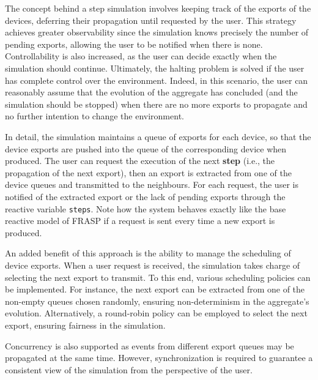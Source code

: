 The concept behind a step simulation involves keeping track of the exports of
the devices, deferring their propagation until requested by the user. This
strategy achieves greater observability since the simulation knows precisely
the number of pending exports, allowing the user to be notified when there is
none. Controllability is also increased, as the user can decide exactly when
the simulation should continue. Ultimately, the halting problem is solved if
the user has complete control over the environment. Indeed, in this scenario,
the user can reasonably assume that the evolution of the aggregate has
concluded (and the simulation should be stopped) when there are no more exports
to propagate and no further intention to change the environment.

In detail, the simulation maintains a queue of exports for each device, so that
the device exports are pushed into the queue of the corresponding device when
produced. The user can request the execution of the next \textbf{step} (i.e.,
the propagation of the next export), then an export is extracted from one of
the device queues and transmitted to the neighbours. For each request, the user
is notified of the extracted export or the lack of pending exports through the
reactive variable \texttt{steps}. Note how the system behaves exactly like the
base reactive model of FRASP if a request is sent every time a new export is
produced.

An added benefit of this approach is the ability to manage the scheduling of
device exports. When a user request is received, the simulation takes charge of
selecting the next export to transmit. To this end, various scheduling policies
can be implemented. For instance, the next export can be extracted from one of
the non-empty queues chosen randomly, ensuring non-determinism in the
aggregate's evolution. Alternatively, a round-robin policy can be employed to
select the next export, ensuring fairness in the simulation.

Concurrency is also supported as events from different export queues may be
propagated at the same time. However, synchronization is required to guarantee
a consistent view of the simulation from the perspective of the user.
